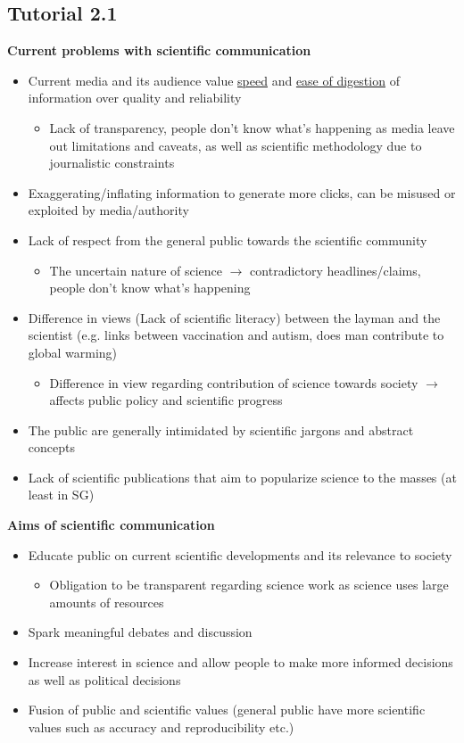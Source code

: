 \documentclass{article}
\begin{document}
\begin{multicols}{2}
\subsection{Tutorial 2.1}
\textbf{Current problems with scientific communication}
\begin{itemize}
	\item Current media and its audience value \underline{speed} and \underline{ease of digestion} of information over quality and reliability
	\begin{itemize}
		\item Lack of transparency, people don't know what's happening as media leave out limitations and caveats, as well as scientific methodology due to journalistic constraints
	\end{itemize}
	\item Exaggerating/inflating information to generate more clicks, can be misused or exploited by media/authority
	\item Lack of respect from the general public towards the scientific community
	\begin{itemize}
		\item The uncertain nature of science $\rightarrow$ contradictory headlines/claims, people don't know what's happening
	\end{itemize}
	\item Difference in views (Lack of scientific literacy) between the layman and the scientist (e.g. links between vaccination and autism, does man contribute to global warming)
	\begin{itemize}
		\item Difference in view regarding contribution of science towards society $\rightarrow$ affects public policy and scientific progress
	\end{itemize}
	\item The public are generally intimidated by scientific jargons and abstract concepts
	\item Lack of scientific publications that aim to popularize science to the masses (at least in SG)\\
\end{itemize}

\textbf{Aims of scientific communication}
\begin{itemize}
	\item Educate public on current scientific developments and its relevance to society
	\begin{itemize}
		\item Obligation to be transparent regarding science work as science uses large amounts of resources
	\end{itemize}
	\item Spark meaningful debates and discussion
	\item Increase interest in science and allow people to make more informed decisions as well as political decisions
	\item Fusion of public and scientific values (general public have more scientific values such as accuracy and reproducibility etc.)\\
\end{itemize}


\end{multicols}
\end{document}
